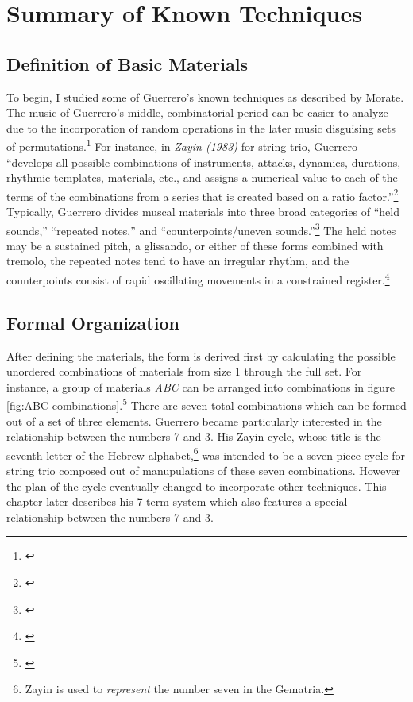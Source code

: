 \section{Summary of Known Techniques}

\subsection{Definition of Basic Materials}

To begin, I studied some of Guerrero's known techniques as described by Morate. The music of Guerrero's middle, combinatorial period can be easier to analyze due to the incorporation of random operations in the later music disguising sets of permutations.\footnote{\citet[293]{guerreropaper}} For instance, in \textit{Zayin (1983)} for string trio, Guerrero ``develops all possible combinations of instruments, attacks, dynamics, durations, rhythmic templates, materials, etc., and assigns a numerical value to each of the terms of the combinations from a series that is created based on a ratio factor.''\footnote{\citet[43]{guerreropaper}} Typically, Guerrero divides muscal materials into three broad categories of ``held sounds,'' ``repeated notes,'' and ``counterpoints/uneven sounds.''\footnote{\citet[150]{guerreropaper}} The held notes may be a sustained pitch, a glissando, or either of these forms combined with tremolo, the repeated notes tend to have an irregular rhythm, and the counterpoints consist of rapid oscillating movements in a constrained register.\footnote{\citet[150]{guerreropaper}}

\subsection{Formal Organization}

After defining the materials, the form is derived first by calculating the possible unordered combinations of materials from size 1 through the full set. For instance, a group of materials \textit{ABC} can be arranged into combinations in figure \ref{fig:ABC-combinations}.\footnote{\citet[150-151]{guerreropaper}} There are seven total combinations which can be formed out of a set of three elements. Guerrero became particularly interested in the relationship between the numbers 7 and 3. His Zayin cycle, whose title is the seventh letter of the Hebrew alphabet,\footnote{Zayin is used to \emph{represent} the number seven in the Gematria.} was intended to be a seven-piece cycle for string trio composed out of manupulations of these seven combinations. However the plan of the cycle eventually changed to incorporate other techniques. This chapter later describes his 7-term system which also features a special relationship between the numbers 7 and 3.


